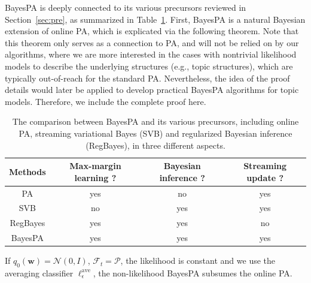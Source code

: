 \documentclass[twoside,11pt]{article}
\newcommand{\prob}{\mathcal{P}}
\begin{document}
BayesPA is deeply connected to its various precursors reviewed in Section~\ref{sec:pre}, as summarized in Table~\ref{table:relationship}. First, BayesPA is a natural Bayesian extension of online PA, which is explicated via the following theorem. Note that this theorem only serves as a connection to PA, and will not be relied on by our algorithms, where we are more interested in the cases with nontrivial likelihood models to describe the underlying structures (e.g., topic structures), which are typically out-of-reach for the standard PA. Nevertheless, the idea of the proof details would later be applied to develop practical BayesPA algorithms for topic models. Therefore, we include the complete proof here.

\begin{table}[t]
\centering
\begin{tabular}{
c|c|c|c}
\hline\hline
 \textbf{Methods} & Max-margin learning ? & Bayesian inference ? & Streaming update ? \\
\hline
PA & yes & no  &  yes  \\
SVB & no & yes  &  yes  \\
RegBayes & yes & yes & no \\
BayesPA & yes & yes & yes \\
\hline\hline
\end{tabular}
\caption{The comparison between BayesPA and its various precursors, including online PA, streaming variational Bayes (SVB) and regularized Bayesian inference (RegBayes), in three different aspects.}\label{table:relationship}\vspace{-0.3cm}
\end{table}

\begin{theorem} \label{tm:subsume}
If $q_0(\bm{w}) = \mathcal{N}(0, I)$, $\mathcal{F}_t=\prob$, the likelihood is constant and we use the averaging classifier $\ell_\epsilon^\text{ave}$, the non-likelihood BayesPA subsumes the online PA.
\end{theorem}
\end{document}
